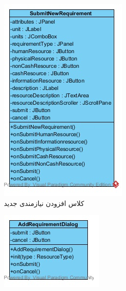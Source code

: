 \begin{figure}[H]
\begin{subfigure}[b]{0.2\textwidth}
		\includegraphics[width=\textwidth]{img/class-design/ui/SubmitNewRequirement.jpg}
		\caption{کلاس افزودن نیازمندی جدید}
	\end{subfigure}
	\begin{subfigure}[b]{0.2\textwidth}
		\includegraphics[width=\textwidth]{img/class-design/ui/AddRequirementDialog.jpg}

\end{subfigure}
\end{figure}
